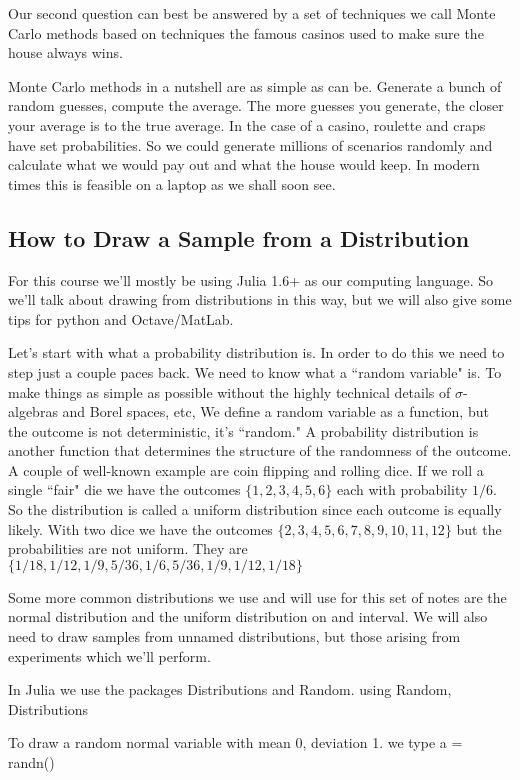 \documentclass{article}
\theoremstyle{definition}
\theoremstyle{remark}
\begin{document}
Our second question can best be answered by a set of techniques we call Monte Carlo methods based on techniques the famous casinos used to make sure the house always wins.

Monte Carlo methods in a nutshell are as simple as can be.
Generate a bunch of random guesses, compute the average.  The more guesses you generate, the closer your average is to the true average.  In the case of a casino, roulette and craps have set probabilities.  So we could generate millions of scenarios randomly and calculate what we would pay out and what the house would keep.  In modern times this is feasible on a laptop as we shall soon see.

\subsection{How to Draw a Sample from a Distribution}

For this course we'll mostly be using Julia 1.6+ as our computing language. So we'll talk about drawing from distributions in this way, but we will also give some tips for python and Octave/MatLab.

Let's start with what a probability distribution is. In order to do this we need to step just a couple paces back.  We need to know what a ``random variable" is.  To make things as simple as possible without the highly technical details of $\sigma$-algebras and Borel spaces, etc, We define a random variable as a function, but the outcome is not deterministic, it's ``random."  A probability distribution is another function that determines the structure of the randomness of the outcome.  A couple of well-known example are coin flipping and rolling dice.
If we roll a single ``fair" die we have the outcomes $\{1,2,3,4,5,6\}$ each with probability $1/6$.  So the distribution is called a uniform distribution since each outcome is equally likely.  With two dice we have the outcomes $\{2,3,4,5,6,7,8,9,10,11,12\}$ but the probabilities are not uniform.  They are $\{1/18,1/12,1/9,5/36,1/6,5/36,1/9,1/12,1/18\}$


Some more common distributions we use and will use for this set of notes are the normal distribution and the uniform distribution on and interval. We will also need to draw samples from unnamed distributions, but those arising from experiments which we'll perform.


In Julia we use the packages Distributions and Random.
using Random, Distributions

To draw a random normal variable with mean 0, deviation 1. we type
a = randn()
\end{document}
